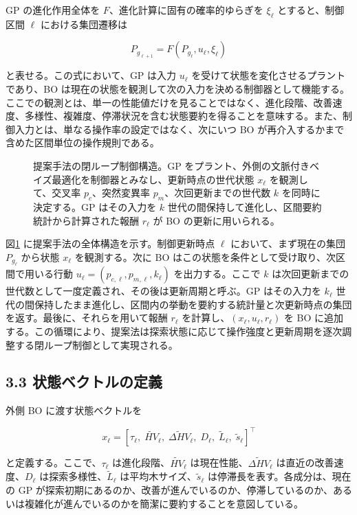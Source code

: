 GP の進化作用全体を $F$、進化計算に固有の確率的ゆらぎを $\xi_\ell$ とすると、制御区間 $\ell$ における集団遷移は

\[
P_{g_{\ell+1}} = F(P_{g_\ell}, u_\ell, \xi_\ell)
\]

と表せる。この式において、GP は入力 $u_\ell$ を受けて状態を変化させるプラントであり、BO は現在の状態を観測して次の入力を決める制御器として機能する。ここでの観測とは、単一の性能値だけを見ることではなく、進化段階、改善速度、多様性、複雑度、停滞状況を含む状態要約を得ることを意味する。また、制御入力とは、単なる操作率の設定ではなく、次にいつ BO が再介入するかまで含めた区間単位の操作規則である。

\begin{figure}[t]
\centering

\caption{提案手法の閉ループ制御構造。GP をプラント、外側の文脈付きベイズ最適化を制御器とみなし、更新時点の世代状態 $x_\ell$ を観測して、交叉率 $p_c$、突然変異率 $p_m$、次回更新までの世代数 $k$ を同時に決定する。GP はその入力を $k$ 世代の間保持して進化し、区間要約統計から計算された報酬 $r_\ell$ が BO の更新に用いられる。}
\label{fig:closed-loop-architecture}
\end{figure}

図\ref{fig:closed-loop-architecture} に提案手法の全体構造を示す。制御更新時点 $\ell$ において、まず現在の集団 $P_{g_\ell}$ から状態 $x_\ell$ を観測する。次に BO はこの状態を条件として受け取り、次区間で用いる行動 $u_\ell = (p_{c,\ell}, p_{m,\ell}, k_\ell)$ を出力する。ここで $k$ は次回更新までの世代数として一度定義され、その後は更新周期と呼ぶ。GP はその入力を $k_\ell$ 世代の間保持したまま進化し、区間内の挙動を要約する統計量と次更新時点の集団を返す。最後に、それらを用いて報酬 $r_\ell$ を計算し、$(x_\ell, u_\ell, r_\ell)$ を BO に追加する。この循環により、提案法は探索状態に応じて操作強度と更新周期を逐次調整する閉ループ制御として実現される。

\subsection{3.3 状態ベクトルの定義}


外側 BO に渡す状態ベクトルを

\[
x_\ell =
\left[
\tau_\ell,\;
\widetilde{HV}_\ell,\;
\widetilde{\Delta HV}_\ell,\;
D_\ell,\;
\widetilde{L}_\ell,\;
\widetilde{s}_\ell
\right]^\top
\]

と定義する。ここで、$\tau_\ell$ は進化段階、$\widetilde{HV}_\ell$ は現在性能、$\widetilde{\Delta HV}_\ell$ は直近の改善速度、$D_\ell$ は探索多様性、$\widetilde{L}_\ell$ は平均木サイズ、$\widetilde{s}_\ell$ は停滞長を表す。各成分は、現在の GP が探索初期にあるのか、改善が進んでいるのか、停滞しているのか、あるいは複雑化が進んでいるのかを簡潔に要約することを意図している。


